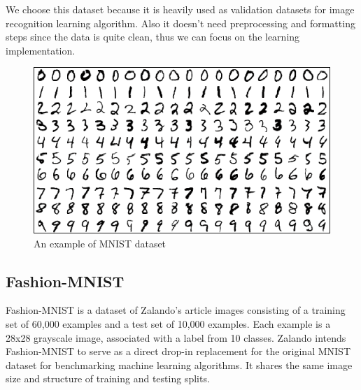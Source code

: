 We choose this dataset because it is heavily used as validation datasets for image recognition learning algorithm. Also it doesn't need preprocessing and formatting steps since the data is quite clean, thus we can focus on the learning implementation.

\begin{figure}[h]
	\includegraphics[scale=0.3]{figures/mnist}
	\centering
	\caption{An example of MNIST dataset}
	\label{fig:mnist}
\end{figure}

\subsection{Fashion-MNIST}
Fashion-MNIST \cite{xiao2017/online} is a dataset of Zalando's article images consisting of a training set of 60,000 examples and a test set of 10,000 examples. Each example is a 28x28 grayscale image, associated with a label from 10 classes. Zalando intends Fashion-MNIST to serve as a direct drop-in replacement for the original MNIST dataset for benchmarking machine learning algorithms. It shares the same image size and structure of training and testing splits.

